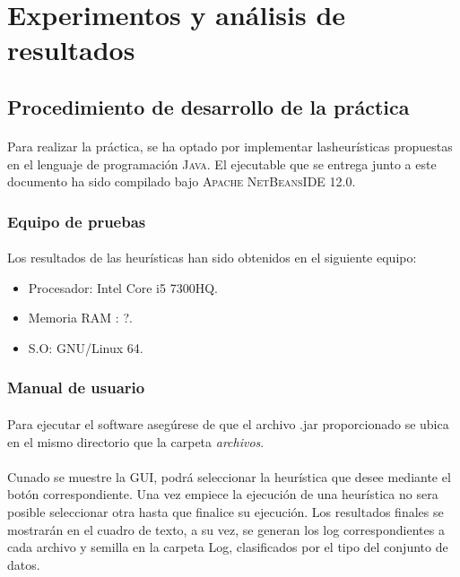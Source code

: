 \documentclass{article}
\begin{document}
	
	\section{Experimentos y análisis de resultados}
	
	\subsection{Procedimiento de desarrollo de la práctica}
	
	\paragraph{}Para realizar la práctica, se ha optado por implementar lasheurísticas propuestas en el lenguaje de programación \textsc{Java}. El ejecutable que se entrega junto a este documento ha sido compilado bajo \textsc{ Apache NetBeansIDE 12.0}.
	
	\subsubsection{Equipo de pruebas}
	
	\paragraph{}Los resultados de las heurísticas han sido obtenidos en el siguiente equipo:
	
		\begin{itemize}
			
			\item Procesador: Intel Core i5 7300HQ.
			\item Memoria RAM : ?.
			\item S.O: GNU/Linux 64.
			
		\end{itemize}

	\subsubsection{Manual de usuario}
	
		\paragraph{}Para ejecutar el software asegúrese de que el archivo .jar proporcionado se ubica en el mismo directorio que la carpeta \emph{archivos}. 
		
		\paragraph{}Cunado se muestre la GUI, podrá seleccionar la heurística que desee mediante el botón correspondiente. Una vez empiece la ejecución de una heurística no sera posible seleccionar otra hasta que finalice su ejecución. Los resultados finales se mostrarán en el cuadro de texto, a su vez, se generan los log correspondientes a cada archivo y semilla en la carpeta Log, clasificados por el tipo del conjunto de datos.
	
\end{document}
